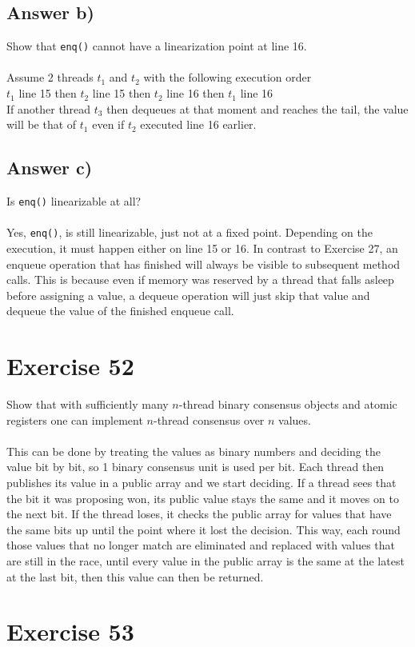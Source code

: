 \documentclass[a4paper,%
11pt,%
DIV=14,
headsepline,%
headings=normal,
]{scrartcl}
\newcommand{\exercise}[1]{\section*{Exercise #1}}
\newcommand{\answer}[1]{\subsection*{Answer #1}}
\begin{document}
\answer{b)}
Show that \texttt{enq()} cannot have a linearization point at line 16.\\
\\
Assume 2 threads $t_1$ and $t_2$ with the following execution order\\
$t_1$ line 15 then $t_2$ line 15 then $t_2$ line 16 then $t_1$ line 16\\
If another thread $t_3$ then dequeues at that moment and reaches the tail, the value will be that of $t_1$ even if $t_2$ executed line 16 earlier.

\answer{c)}
Is \texttt{enq()} linearizable at all?\\
\\
Yes, \texttt{enq()}, is still linearizable, just not at a fixed point. Depending on the execution, it must happen either on line 15 or 16. In contrast to Exercise 27, an enqueue operation that has finished will always be visible to subsequent method calls. This is because even if memory was reserved by a thread that falls asleep before assigning a value, a dequeue operation will just skip that value and dequeue the value of the finished enqueue call.

\exercise{52}

Show that with sufficiently many $n$-thread binary consensus objects and atomic registers one can implement $n$-thread consensus over $n$ values.\\
\\
This can be done by treating the values as binary numbers and deciding the value bit by bit, so 1 binary consensus unit is used per bit. Each thread then publishes its value in a public array and we start deciding. If a thread sees that the bit it was proposing won, its public value stays the same and it moves on to the next bit. If the thread loses, it checks the public array for values that have the same bits up until the point where it lost the decision. This way, each round those values that no longer match are eliminated and replaced with values that are still in the race, until every value in the public array is the same at the latest at the last bit, then this value can then be returned.

\exercise{53}
\end{document}
